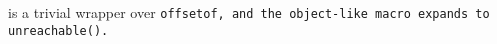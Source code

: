  is a trivial wrapper over \tt{offsetof}, and the
object-like macro  expands to \tt{unreachable()}.
